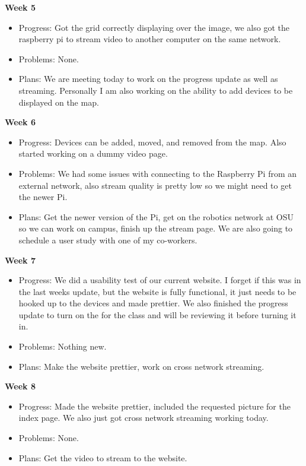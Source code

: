 \documentclass[onecolumn, draftclsnofoot,10pt, compsoc]{IEEEtran}
\begin{document}
        \textbf{Week 5}
        \begin{itemize}
            \item Progress: Got the grid correctly displaying over the image, we also got the raspberry pi to stream video to another computer on the same network.

            \item Problems: None.

            \item Plans: We are meeting today to work on the progress update as well as streaming. Personally I am also working on the ability to add devices to be displayed on the map.
        \end{itemize}
        \textbf{Week 6}
        \begin{itemize}
            \item Progress: Devices can be added, moved, and removed from the map. Also started working on a dummy video page.

            \item Problems: We had some issues with connecting to the Raspberry Pi from an external network, also stream quality is pretty low so we might need to get the newer Pi.

            \item Plans: Get the newer version of the Pi, get on the robotics network at OSU so we can work on campus, finish up the stream page. We are also going to schedule a user study with one of my co-workers.
        \end{itemize}
        \textbf{Week 7}
        \begin{itemize}
            \item Progress: We did a usability test of our current website. I forget if this was in the last weeks update, but the website is fully functional, it just needs to be hooked up to the devices and made prettier. We also finished the progress update to turn on the for the class and will be reviewing it before turning it in.

            \item Problems: Nothing new.

            \item Plans: Make the website prettier, work on cross network streaming.
        \end{itemize}
        \textbf{Week 8}
        \begin{itemize}
            \item Progress: Made the website prettier, included the requested picture for the index page. We also just got cross network streaming working today.
            \item Problems: None.
            \item Plans: Get the video to stream to the website.
        \end{itemize}
\end{document}
